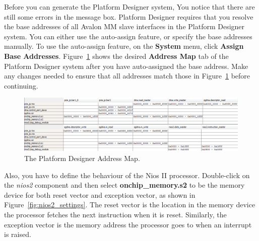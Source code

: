 \documentclass[11pt, twoside, pdftex]{article}
\begin{document}
Before you can generate the Platform Designer system, You notice that there are still some errors in the message box. Platform Designer requires that you resolve the base addresses of all Avalon MM slave interfaces in the Platform Designer system. You can either use the auto-assign feature, or specify the base addresses manually. To use the auto-assign feature, on the {\bf System} menu, click {\bf Assign Base Addresses}. Figure~\ref{fig:qsys_address_map} shows the desired {\bf Address Map} tab of the Platform Designer system after you have auto-assigned the base address. Make any changes needed to ensure that all addresses match those in Figure~\ref{fig:qsys_address_map} before continuing.

\begin{figure}[H]
	\centering
	\includegraphics[scale=0.55]{figures/qsys_address_map.png}
	\caption{The Platform Designer Address Map.} 
	\label{fig:qsys_address_map}
\end{figure}

Also, you have to define the behaviour of the Nios II processor. Double-click on the {\it nios2} component and then select {\bf onchip\_memory.s2} to be the memory device for both reset vector and exception vector, as shown in Figure~\ref{fig:nios2_settings}. The reset vector is the location in the memory device the processor fetches the next instruction when it is reset. Similarly, the exception vector is the memory address the processor goes to when an interrupt is raised.
\end{document}
